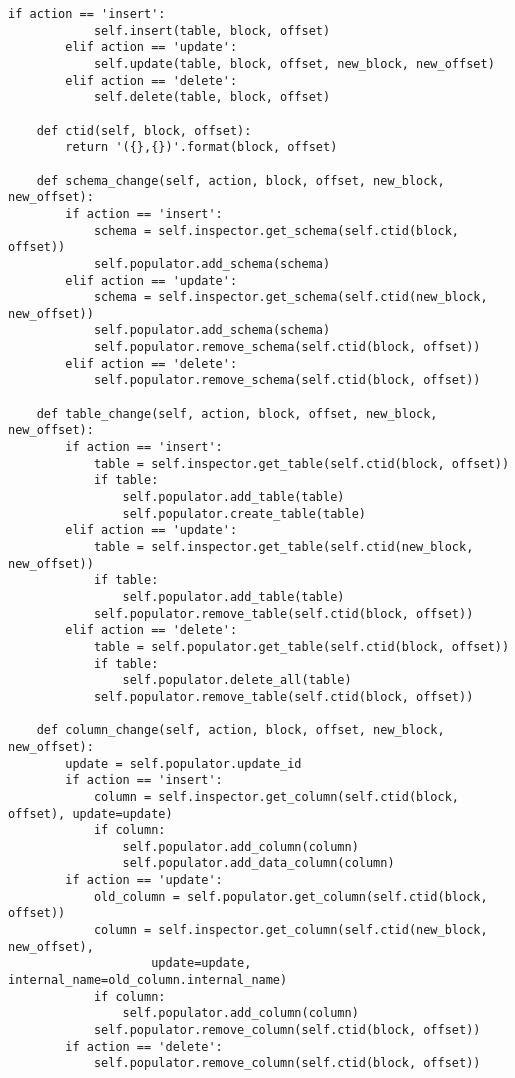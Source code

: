 \begin{lstlisting}[caption={history.py}]
        if action == 'insert':
            self.insert(table, block, offset)
        elif action == 'update':
            self.update(table, block, offset, new_block, new_offset)
        elif action == 'delete':
            self.delete(table, block, offset)

    def ctid(self, block, offset):
        return '({},{})'.format(block, offset)

    def schema_change(self, action, block, offset, new_block, new_offset):
        if action == 'insert':
            schema = self.inspector.get_schema(self.ctid(block, offset))
            self.populator.add_schema(schema)
        elif action == 'update':
            schema = self.inspector.get_schema(self.ctid(new_block, new_offset))
            self.populator.add_schema(schema)
            self.populator.remove_schema(self.ctid(block, offset))
        elif action == 'delete':
            self.populator.remove_schema(self.ctid(block, offset))

    def table_change(self, action, block, offset, new_block, new_offset):
        if action == 'insert':
            table = self.inspector.get_table(self.ctid(block, offset))
            if table:
                self.populator.add_table(table)
                self.populator.create_table(table)
        elif action == 'update':
            table = self.inspector.get_table(self.ctid(new_block, new_offset))
            if table:
                self.populator.add_table(table)
            self.populator.remove_table(self.ctid(block, offset))
        elif action == 'delete':
            table = self.populator.get_table(self.ctid(block, offset))
            if table:
                self.populator.delete_all(table)
            self.populator.remove_table(self.ctid(block, offset))

    def column_change(self, action, block, offset, new_block, new_offset):
        update = self.populator.update_id
        if action == 'insert':
            column = self.inspector.get_column(self.ctid(block, offset), update=update)
            if column:
                self.populator.add_column(column)
                self.populator.add_data_column(column)
        if action == 'update':
            old_column = self.populator.get_column(self.ctid(block, offset))
            column = self.inspector.get_column(self.ctid(new_block, new_offset),
                    update=update, internal_name=old_column.internal_name)
            if column:
                self.populator.add_column(column)
            self.populator.remove_column(self.ctid(block, offset))
        if action == 'delete':
            self.populator.remove_column(self.ctid(block, offset))


\end{lstlisting}
